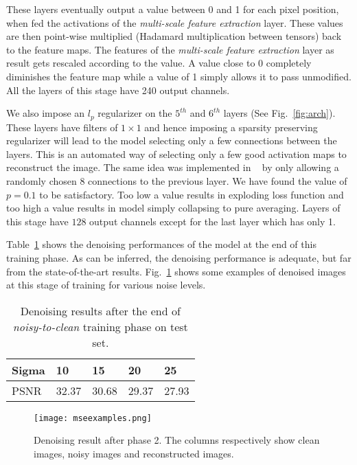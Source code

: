 \documentclass[10pt,twocolumn,letterpaper]{proc}
\begin{document}
These layers eventually output a value between 0 and 1 for each pixel position, when fed the activations of the \textit{multi-scale feature extraction} layer. These values are then point-wise multiplied (Hadamard multiplication between tensors) back to the feature maps. The features of the  \textit{multi-scale feature extraction} layer as result gets rescaled according to the value. A value close to 0 completely diminishes the feature map while a value of 1 simply allows it to pass unmodified. All the layers of this stage have 240 output channels.

We also impose an $l_p$ regularizer on the $5^{th}$ and $6^{th}$ layers (See Fig.~\ref{fig:arch}). These layers have filters of $1 \times 1$ and hence imposing a sparsity preserving regularizer will lead to the model selecting only a few connections between the layers. This is an automated way of selecting only a few good activation maps to reconstruct the image. The same idea was implemented in ~\cite{NIPS2008_3506} by only allowing a randomly chosen $8$ connections to the previous layer. We have found the value of $p=0.1$ to be satisfactory. Too low a value results in exploding loss function and too high a value results in model simply collapsing to pure averaging. Layers of this stage have $128$ output channels except for the last layer which has only 1. 


Table~\ref{tab:mse-training} shows the denoising performances of the model at the end of this training phase. As can be inferred, the denoising performance is adequate, but far from the state-of-the-art results. Fig.~\ref{fig:mse-examples} shows some examples of denoised images at this stage of training for various noise levels. 

\begin{table}[htbp]
\caption{Denoising results after the end of \textit{noisy-to-clean} training phase on test set.}
    \centering
    \begin{tabular}{|lllll|}
\hline
Sigma     & 10    & 15    & 20    & 25\\\hline
PSNR      & 32.37 & 30.68 & 29.37 & 27.93 \\\hline
\end{tabular}
    \label{tab:mse-training}
\end{table}

\begin{figure}[htbp]
    \centering
    \texttt{[image: mseexamples.png]}
    \caption{Denoising result after phase 2. The columns respectively show clean images, noisy images and reconstructed images.}
    \label{fig:mse-examples}
\end{figure}
\end{document}
